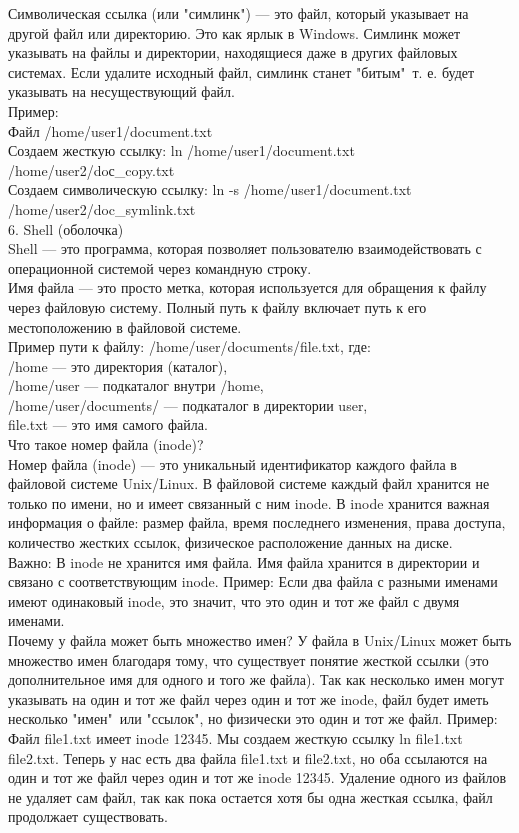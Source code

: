 Символическая ссылка (или "симлинк") — это файл, который указывает на другой файл или директорию. Это как ярлык в Windows. Симлинк может указывать на файлы и директории, находящиеся даже в других файловых системах. Если удалите исходный файл, симлинк станет "битым"\, т. е. будет указывать на несуществующий файл. \\
Пример: \\
Файл /home/user1/document.txt \\
Создаем жесткую ссылку: ln /home/user1/document.txt \\ /home/user2/doс\_copy.txt \\
Создаем символическую ссылку: ln -s /home/user1/document.txt \\ /home/user2/doc\_symlink.txt \\
6. Shell (оболочка) \\
Shell — это программа, которая позволяет пользователю взаимодействовать с операционной системой через командную строку. \\
Имя файла — это просто метка, которая используется для обращения к файлу через файловую систему. Полный путь к файлу включает путь к его местоположению в файловой системе. \\
Пример пути к файлу:  /home/user/documents/file.txt, где: \\
/home — это директория (каталог), \\
/home/user — подкаталог внутри /home, \\
/home/user/documents/ — подкаталог в директории user, \\
file.txt — это имя самого файла. \\
Что такое номер файла (inode)? \\
Номер файла (inode) — это уникальный идентификатор каждого файла в файловой системе Unix/Linux. В файловой системе каждый файл хранится не только по имени, но и имеет связанный с ним inode. В inode хранится важная информация о файле: размер файла, время последнего изменения, права доступа, количество жестких ссылок, физическое расположение данных на диске. \\
Важно: В inode не хранится имя файла. Имя файла хранится в директории и связано с соответствующим inode. Пример: Если два файла с разными именами имеют одинаковый inode, это значит, что это один и тот же файл с двумя именами. \\
Почему у файла может быть множество имен?
У файла в Unix/Linux может быть множество имен благодаря тому, что существует понятие жесткой ссылки (это дополнительное имя для одного и того же файла). Так как несколько имен могут указывать на один и тот же файл через один и тот же inode, файл будет иметь несколько "имен"\ или "ссылок", но физически это один и тот же файл. Пример: \\
Файл file1.txt имеет inode 12345. Мы создаем жесткую ссылку ln file1.txt file2.txt. Теперь у нас есть два файла file1.txt и file2.txt, но оба ссылаются на один и тот же файл через один и тот же inode 12345. Удаление одного из файлов не удаляет сам файл, так как пока остается хотя бы одна жесткая ссылка, файл продолжает существовать. \\

